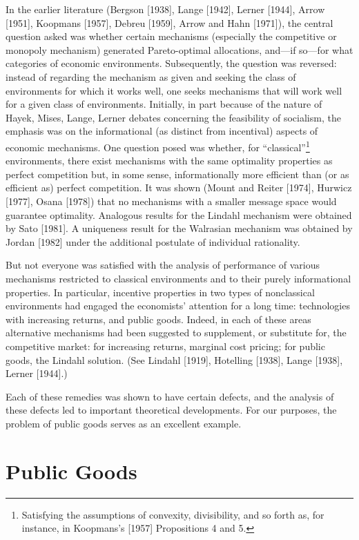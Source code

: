 \documentclass[12pt, letterpaper]{article}
\begin{document}
In the earlier literature (Bergson [1938], Lange [1942], Lerner [1944], Arrow [1951], Koopmans [1957], Debreu [1959], Arrow and Hahn [1971]), the central question asked was whether certain mechanisms (especially the competitive or monopoly mechanism) generated Pareto-optimal allocations, and---if so---for what categories of economic environments. Subsequently, the question was reversed: instead of regarding the mechanism as given and seeking the class of environments for which it works well, one seeks mechanisms that will work well for a given class of environments. Initially, in part because of the nature of Hayek, Mises, Lange, Lerner debates concerning the feasibility of socialism, the emphasis was on the informational (as distinct from incentival) aspects of economic mechanisms. One question posed was whether, for ``classical''\footnote{Satisfying the assumptions of convexity, divisibility, and so forth as, for instance, in Koopmans's [1957] Propositions 4 and 5.} environments, there exist mechanisms with the same optimality properties as perfect competition but, in some sense, informationally more efficient than (or as efficient as) perfect competition. It was shown (Mount and Reiter [1974], Hurwicz [1977], Osana [1978]) that no mechanisms with a smaller message space would guarantee optimality. Analogous results for the Lindahl mechanism were obtained by Sato [1981]. A uniqueness result for the Walrasian mechanism was obtained by Jordan [1982] under the additional postulate of individual rationality.

But not everyone was satisfied with the analysis of performance of various mechanisms restricted to classical environments and to their purely informational properties. In particular, incentive properties in two types of nonclassical environments had engaged the economists' attention for a long time: technologies with increasing returns, and public goods. Indeed, in each of these areas alternative mechanisms had been suggested to supplement, or substitute for, the competitive market: for increasing returns, marginal cost pricing; for public goods, the Lindahl solution. (See Lindahl [1919], Hotelling [1938], Lange [1938], Lerner [1944].)

Each of these remedies was shown to have certain defects, and the analysis of these defects led to important theoretical developments. For our purposes, the problem of public goods serves as an excellent example.

\section*{Public Goods}
\end{document}
